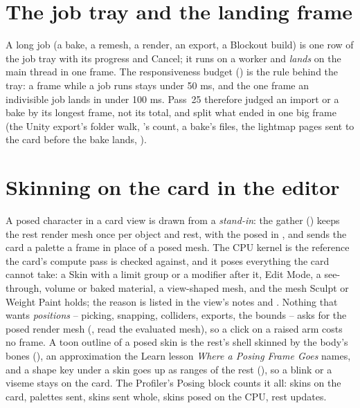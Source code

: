 \section{The job tray and the landing frame}
A long job (a bake, a remesh, a render, an export, a Blockout build) is one row of the job tray with its progress and
Cancel; it runs on a worker and \emph{lands} on the main thread in one frame. The responsiveness budget () is the
rule behind the tray: a frame while a job runs stays under 50 ms, and the one frame an indivisible job lands in under
100 ms. Pass~25 therefore judged an import or a bake by its longest frame, not its total, and split what ended in one
big frame (the Unity export's folder walk, 's count, a bake's files, the lightmap pages sent to the card
before the bake lands, ).

\section{Skinning on the card in the editor}
A posed character in a card view is drawn from a \emph{stand-in}: the gather () keeps the rest render
mesh once per object and rest, with the posed  in , and sends the card a palette a frame in
place of a posed mesh. The CPU kernel  is the reference the card's compute pass is checked
against, and it poses everything the card cannot take: a Skin with a limit group or a modifier after it, Edit Mode, a
see-through, volume or baked material, a view-shaped mesh, and the mesh Sculpt or Weight Paint holds; the reason is listed in
the view's notes and . Nothing that wants \emph{positions} -- picking, snapping, colliders, exports, the
bounds -- asks for the posed render mesh (,  read the evaluated mesh), so a click on a
raised arm costs no frame. A toon outline of a posed skin is the rest's shell skinned by the body's bones
(), an approximation the Learn lesson \emph{Where a Posing Frame Goes} names, and a shape key under
a skin goes up as ranges of the rest (), so a blink or a viseme stays on the card. The Profiler's
Posing block counts it all: skins on the card, palettes sent, skins sent whole, skins posed on the CPU, rest updates.

